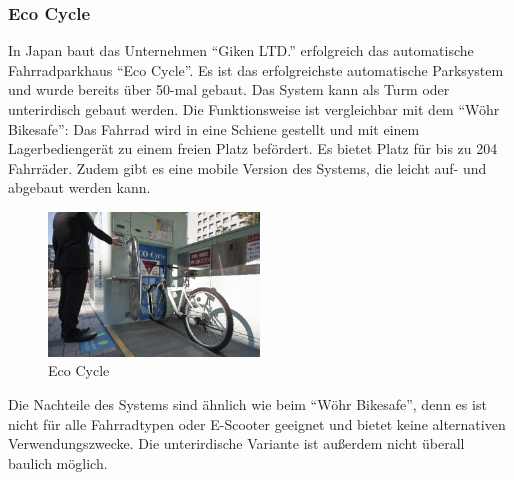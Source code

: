 \subsubsection{Eco Cycle}
In Japan baut das Unternehmen \enquote{Giken LTD.} erfolgreich das automatische Fahrradparkhaus \enquote{Eco Cycle}. Es ist das erfolgreichste automatische Parksystem und wurde bereits über 50-mal gebaut.  Das System kann als Turm oder unterirdisch gebaut werden. Die Funktionsweise ist vergleichbar mit dem \enquote{Wöhr Bikesafe}: Das Fahrrad wird in eine Schiene gestellt und mit einem Lagerbediengerät zu einem freien Platz befördert. Es bietet Platz für bis zu 204 Fahrräder.\cite*{ecocycle} Zudem gibt es eine mobile Version des Systems, die leicht auf- und abgebaut werden kann.\cite*{ecocyclemobile}

\begin{figure}[H]
    \centering
    \includegraphics[width=0.5\textwidth]{images/ecocycle.jpg}
    \caption{Eco Cycle }
    \label{fig:ecocycle}
\end{figure}

\noindent Die Nachteile des Systems sind ähnlich wie beim \enquote{Wöhr Bikesafe}, denn es ist nicht für alle Fahrradtypen oder E-Scooter geeignet und bietet keine alternativen Verwendungszwecke. Die unterirdische Variante ist außerdem nicht überall baulich möglich.